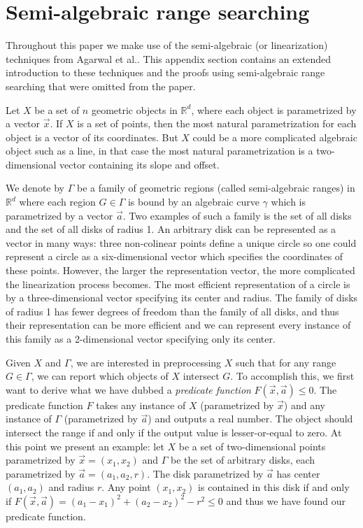 \documentclass[UKenglish]{lipics-v2019}
\newcommand{\etal}{\textnormal{et al.}\xspace}
\begin{document}
\newpage



\newpage
\appendix



\section{Semi-algebraic range searching}
\label{appx:rangesearch}

Throughout this paper we make use of the semi-algebraic (or linearization) techniques from Agarwal \etal \cite{agarwal2013range}. This appendix section contains an extended introduction to these techniques and the proofs using semi-algebraic range searching that were omitted from the paper.

Let $X$ be a set of $n$ geometric objects in $\mathbb{R}^d$, where each object is parametrized by a vector $\vec{x}$. If $X$ is a set of points, then the most natural parametrization for each object is a vector of its coordinates. But $X$ could be a more complicated algebraic object such as a line, in that case the most natural parametrization is a two-dimensional vector containing its slope and offset.

We denote by $\Gamma$ be a family of geometric regions (called semi-algebraic ranges) in $\mathbb{R}^d$ where each region $G \in \Gamma$ is bound by an algebraic curve $\gamma$ which is parametrized by a vector $\vec{a}$. Two examples of such a family is the set of all disks and the set of all disks of radius 1. An arbitrary disk can be represented as a vector in many ways: three non-colinear points define a unique circle so one could represent a circle as a six-dimensional vector which specifies the coordinates of these points. However, the larger the representation vector, the more complicated the linearization process becomes. The most efficient representation of a circle is by a three-dimensional vector specifying its center and radius. The family of disks of radius 1 has fewer degrees of freedom than the family of all disks, and thus their representation can be more efficient and we can represent every instance of this family as a 2-dimensional vector specifying only its center.

Given $X$ and $\Gamma$, we are interested in preprocessing $X$ such that for any range $G \in \Gamma$, we can report which objects of $X$ intersect $G$. To accomplish this, we first want to derive what we have dubbed a \emph{predicate function} $F(\vec{x}, \vec{a}) \le 0$. The predicate function $F$ takes any instance of $X$ (parametrized by $\vec{x}$) and any instance of $\Gamma$ (parametrized by $\vec{a}$) and outputs a real number. The object should intersect the range if and only if the output value is lesser-or-equal to zero. At this point we present an example: let $X$ be a set of two-dimensional points parametrized by $\vec{x} = (x_1, x_2)$ and $\Gamma$ be the set of arbitrary disks, each parametrized by $\vec{a} = (a_1, a_2, r)$. The disk parametrized by $\vec{a}$ has center $(a_1, a_2)$ and radius $r$. Any point $(x_1, x_2)$ is contained in this disk if and only if $F(\vec{x}, \vec{a}) = (a_1 - x_1)^2 + (a_2 - x_2)^2 - r^2 \le 0$ and thus we have found our predicate function.
\end{document}
